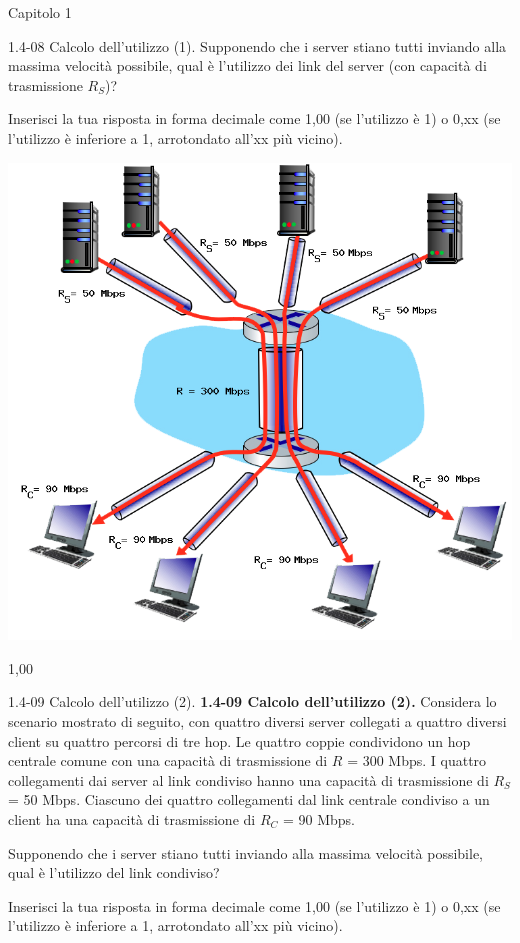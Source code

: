 \documentclass[a4paper]{article}
\begin{document}
\begin{quiz}{Capitolo 1}
\begin{shortanswer}[points=1,shuffle=true]{1.4-08 Calcolo dell'utilizzo (1).}
Supponendo che i server stiano tutti inviando alla massima velocità possibile, qual è l'utilizzo dei link del server (con capacità di trasmissione $R_S$)?

Inserisci la tua risposta in forma decimale come 1,00 (se l'utilizzo è 1) o 0,xx (se l'utilizzo è inferiore a 1, arrotondato all'xx più vicino).

\begin{center}
\includegraphics[width=0.7\linewidth]{figs/1.4.7.png}
\end{center}
\item 1,00
\end{shortanswer}

\begin{shortanswer}[points=1,shuffle=true]{1.4-09 Calcolo dell'utilizzo (2).}
\textbf{1.4-09 Calcolo dell'utilizzo (2).}
Considera lo scenario mostrato di seguito, con quattro diversi server collegati a quattro diversi client su quattro percorsi di tre hop. Le quattro coppie condividono un hop centrale comune con una capacità di trasmissione di $R$ = 300 Mbps. I quattro collegamenti dai server al link condiviso hanno una capacità di trasmissione di $R_S$ = 50 Mbps. Ciascuno dei quattro collegamenti dal link centrale condiviso a un client ha una capacità di trasmissione di $R_C$ = 90 Mbps.

Supponendo che i server stiano tutti inviando alla massima velocità possibile, qual è l'utilizzo del link condiviso?

Inserisci la tua risposta in forma decimale come 1,00 (se l'utilizzo è 1) o 0,xx (se l'utilizzo è inferiore a 1, arrotondato all'xx più vicino).


\end{shortanswer}
\end{quiz}
\end{document}
